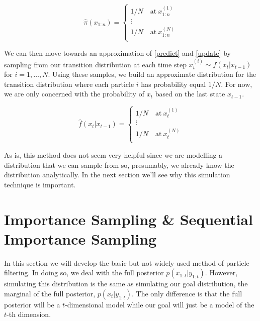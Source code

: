\documentclass{article}
\begin{document}
\begin{equation}
\widehat{\pi}(x_{1:n}) = \begin{cases}
1/N \quad \text{at} \ x_{1:n}^{(1)} \\
\vdots \\
1/N \quad \text{at} \ x_{1:n}^{(N)} \\
\end{cases}
\end{equation}

We can then move towards an approximation of \eqref{predict} and \eqref{update} by sampling from our transition distribution at each time step $x_{t}^{(i)} \sim f(x_t|x_{t-1})$ for $i = 1,\dots,N$. Using these samples, we build an approximate distribution for the transition distribution where each particle $i$ has probability equal $1/N$. For now, we are only concerned with the probability of $x_t$ based on the last state $x_{t-1}$.

\begin{equation}
\widehat{f}(x_t|x_{t-1}) = \begin{cases}
1/N \quad \text{at} \ x_{t}^{(1)} \\
\vdots \\
1/N \quad \text{at} \ x_{t}^{(N)} \\
\end{cases}
\end{equation}

As is, this method does not seem very helpful since we are modelling a distribution that we can sample from so, presumably, we already know the distribution analytically. In the next section we'll see why this simulation technique is important.


\section{Importance Sampling \& Sequential Importance Sampling}
In this section we will develop the basic but not widely used method of particle filtering. In doing so, we deal with the full posterior $p(x_{1:t}|y_{1:t})$. However, simulating this distribution is the same as simulating our goal distribution, the marginal of the full posterior, $p(x_t|y_{1:t})$. The only difference is that the full posterior will be a $t$-dimensional model while our goal will just be a model of the $t$-th dimension.
\end{document}
